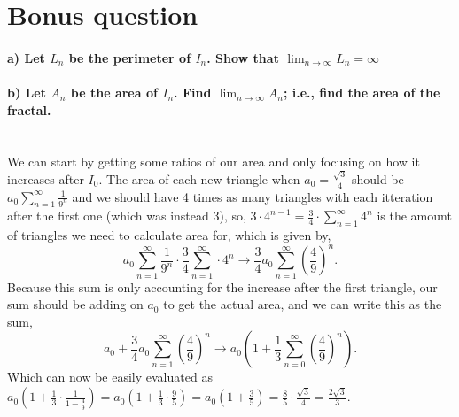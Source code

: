 \documentclass{report}
\begin{document}
\section*{Bonus question}%
\paragraph{a) Let $ L_n $ be the perimeter of $ I_n $. Show that $ \lim_{ n \to \infty} L_n = \infty$}
\paragraph{b) Let $ A_n $ be the area of $ I_n $. Find $ \lim_{ n \to \infty} A_n  $; i.e., find the area of the fractal. \\ \\}
We can start by getting some ratios of our area and only focusing on how it increases after $ I_0 $. The area of each new triangle when $ a_0 = \frac{ \sqrt{ 3 }  }{ 4 } $ should be $ a_0 \sum_{ n=1 } ^{ \infty } \frac{1}{ 9^{ n } }  $ and we should have 4 times as many triangles with each itteration after the first one (which was instead 3), so, $ 3 \cdot 4^{ n-1 } = \frac{ 3 }{ 4 } \cdot \sum_{ n=1 } ^{ \infty } 4^{ n } $ is the amount of triangles we need to calculate area for, which is given by,
 \[
a_0\sum_{ n=1 } ^{ \infty }\frac{ 1 }{ 9^{ n } }\cdot \frac{ 3 }{ 4 } \sum_{ n=1 } ^{ \infty } \cdot 4^{ n } \to \frac{ 3 }{ 4 } a_0 \sum_{ n=1 } ^{ \infty } \left( \frac{ 4 }{ 9 }  \right)^{ n }
.\] 
Because this sum is only accounting for the increase after the first triangle, our sum should be adding on $ a_0 $ to get the actual area, and we can write this as the sum,
\[
	a_0 + \frac{ 3 }{ 4 } a_0 \sum_{ n=1 } ^{ \infty } \left( \frac{ 4 }{ 9 }  \right)^{ n } \to a_0\left(   1+\frac{ 1 }{ 3 } \sum_{ n=0 } ^{ \infty } \left( \frac{ 4 }{ 9 }  \right) ^{ n }\right)
.\] 
Which can now be easily evaluated as $ a_0\left( 1+\frac{ 1 }{ 3 } \cdot \frac{ 1 }{ 1-\frac{ 4 }{ 9 } } \right) = a_0\left( 1+\frac{ 1 }{ 3 } \cdot \frac{ 9 }{ 5 } \right) = a_0\left( 1+\frac{ 3 }{ 5 } \right) = \frac{ 8 }{ 5 } \cdot \frac{ \sqrt{ 3 }  }{ 4 } = \frac{ 2\sqrt{ 3 }  }{ 3 }$. 
\end{document}
